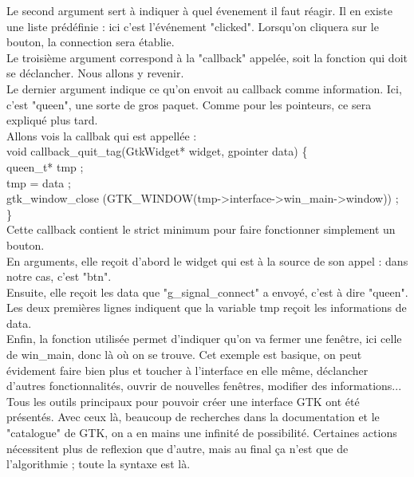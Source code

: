 \documentclass[11pt,french,a4paper]{report}
\begin{document}
Le second argument sert à indiquer à quel évenement il faut réagir. Il en existe une liste prédéfinie : ici
c'est l'événement "clicked". Lorsqu'on cliquera sur le bouton, la connection sera établie. \\

Le troisième argument correspond à la "callback" appelée, soit la fonction qui doit se déclancher. Nous allons 
y revenir. \\

Le dernier argument indique ce qu'on envoit au callback comme information. Ici, c'est "queen", une sorte de 
gros paquet. Comme pour les pointeurs, ce sera expliqué plus tard. \\


Allons vois la callbak qui est appellée : \\

void callback\_quit\_tag(GtkWidget* widget, gpointer data) \{ \\                                      
    queen\_t* tmp ; \\                                                                             
    tmp = data ; \\                                                                               
    gtk\_window\_close (GTK\_WINDOW(tmp->interface->win\_main->window)) ; \\
\} \\

Cette callback contient le strict minimum pour faire fonctionner simplement un bouton.\\
En arguments, elle reçoit d'abord le widget qui est à la source de son appel : dans notre cas, c'est "btn". \\
Ensuite, elle reçoit les data que "g\_signal\_connect" a envoyé, c'est à dire "queen". \\

Les deux premières lignes indiquent que la variable tmp reçoit les informations de data. \\
Enfin, la fonction utilisée permet d'indiquer qu'on va fermer une fenêtre, ici celle de win\_main, donc là où on
se trouve. Cet exemple est basique, on peut évidement faire bien plus et toucher à l'interface en elle même, déclancher
d'autres fonctionnalités, ouvrir de nouvelles fenêtres, modifier des informations...\\

Tous les outils principaux pour pouvoir créer une interface GTK ont été présentés. Avec ceux là, beaucoup de recherches
dans la documentation et le "catalogue" %
de GTK, on a en mains une infinité de possibilité. Certaines actions nécessitent plus de reflexion que d'autre, mais 
au final ça n'est que de l'algorithmie ; toute la syntaxe est là. \\
\end{document}
